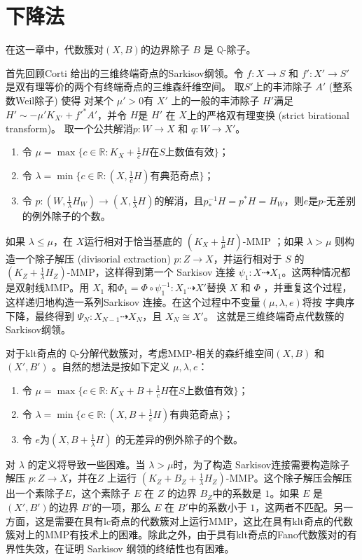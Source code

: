 \chapter{下降法}
在这一章中，代数簇对$(X,B)$的边界除子 $B$ 是 $\mathbb{Q}$-除子。 

首先回顾Corti \cite{cortiFactoringBirationalMaps} 给出的三维终端奇点的Sarkisov纲领。令 $f: X\to S$ 和 $f':X'\to S'$ 是双有理等价的两个有终端奇点的三维森纤维空间。
取$S'$上的丰沛除子 $A'$ (整系数Weil除子) 使得 对某个 $\mu'>0$有 $X'$ 上的一般的丰沛除子 $H'$满足$H'\sim -\mu'K_{X'}+f'^*A'$，并令 $H$是  $H'$ 在 $X$上的严格双有理变换 (strict birational transform)。 取一个公共解消$p: W\to X$ 和 $q:W \to X'$。
\begin{enumerate}
  \item 令 $\mu= \max \{c \in \mathbb{R} : K_{X}+\frac{1}{c}H \text{在} S \text{上数值有效} \}$；
  \item 令 $\lambda = \min \{c\in \mathbb{R}: (X,\frac{1}{c}H) \text{有典范奇点}  \}$；
  \item 令 $p:(W, \frac{1}{\lambda} H_{W})\to (X,\frac{1}{\lambda}H)$的解消，且$p^{-1}_{*}H=p^{*}H=H_{W}$，则$e$是$p$-无差别的例外除子的个数。
\end{enumerate}
如果 $\lambda \leqslant \mu$，在 $X$运行相对于恰当基底的 $(K_X+\frac{1}{\mu}H)$-MMP ；如果 $\lambda > \mu$ 则构造一个除子解压 (divisorial extraction) $ p:Z \to X$，并运行相对于 $ S$ 的 $ (K_Z+\frac{1}{\lambda}H_Z)$-MMP，这样得到第一个 Sarkisov 连接 $\psi_1: X\dashrightarrow  X_{1}$。这两种情况都是双射线MMP。用 $X_{1}$ 和$\Phi_{1}=\Phi\circ\psi_1^{-1}: X_1\dashrightarrow X'$替换 $X$ 和 $\Phi$ ，并重复这个过程，这样递归地构造一系列Sarkisov 连接。在这个过程中不变量$(\mu,\lambda,e)$将按 字典序下降，最终得到 $\Psi_{N}:X_{N-1} \dashrightarrow X_{N}$，且 $X_{N}\cong X'$。 这就是三维终端奇点代数簇的Sarkisov纲领。

对于klt奇点的 $\mathbb{Q}$-分解代数簇对，考虑MMP-相关的森纤维空间$(X,B)$ 和 $(X',B')$ 。自然的想法是按如下定义 $\mu,\lambda,e$：
\begin{enumerate}
  \item 令 $\mu= \max \{c \in \mathbb{R} : K_{X}+B+\frac{1}{c}H \text{在} S \text{上数值有效} \}$；
  \item 令 $\lambda = \min \{c\in \mathbb{R}: (X,B+\frac{1}{c}H) \text{有典范奇点}  \}$；
  \item 令 $e $为$  (X,B+\frac{1}{\lambda}H)$ 的无差异的例外除子的个数。
\end{enumerate}

对 $\lambda$ 的定义将导致一些困难。当 $\lambda > \mu$时，为了构造 Sarkisov连接需要构造除子解压 $p:Z \to X$，并在$Z$ 上运行 $(K_Z+B_Z+\frac{1}{\lambda}H_Z)$-MMP。这个除子解压会解压出一个素除子$E$，这个素除子 $E$ 在 $Z$ 的边界  $B_Z$中的系数是 $1$。如果 $E$ 是 $(X',B')$的边界 $B'$的一项，那么 $E$ 在 $B'$中的系数小于 $1$，这两者不匹配。另一方面，这是需要在具有lc奇点的代数簇对上运行MMP，这比在具有klt奇点的代数簇对上的MMP有技术上的困难。除此之外，由于具有klt奇点的Fano代数簇对的有界性失效，在证明 Sarkisov 纲领的终结性也有困难。

